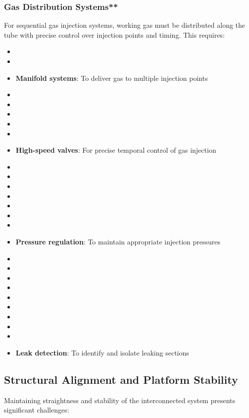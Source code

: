 \subsubsection{Gas Distribution Systems**}
For sequential gas injection systems, working gas must be distributed along the tube with precise control over injection points and timing. This requires:
\begin{itemize}
    \item \item \item \textbf{Manifold systems}: To deliver gas to multiple injection points \cite{white2010}
    \item \item \item \item \item \item \textbf{High-speed valves}: For precise temporal control of gas injection \cite{boyer2003}
    \item \item \item \item \item \item \item \item \textbf{Pressure regulation}: To maintain appropriate injection pressures \cite{shaw2003}
    \item \item \item \item \item \item \item \item \item \item \textbf{Leak detection}: To identify and isolate leaking sections \cite{holland2004}
\end{itemize}

\subsection{Structural Alignment and Platform Stability}
Maintaining straightness and stability of the interconnected system presents significant challenges:

